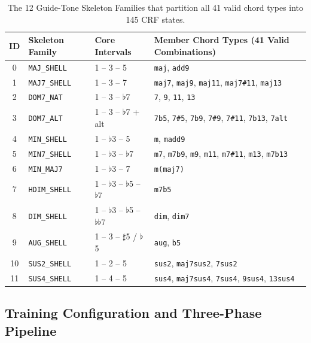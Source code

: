 \documentclass[a4paper]{article}
\begin{document}
\begin{table}[H]
    \centering
    \small
    \begin{tabular}{@{}clll@{}}
        \toprule
        \textbf{ID} & \textbf{Skeleton Family} & \textbf{Core Intervals} & \textbf{Member Chord Types (41 Valid Combinations)} \\
        \midrule
        0  & \texttt{MAJ\_SHELL}  & 1 -- 3 -- 5        & \texttt{maj}, \texttt{add9} \\
        1  & \texttt{MAJ7\_SHELL} & 1 -- 3 -- 7        & \texttt{maj7}, \texttt{maj9}, \texttt{maj11}, \texttt{maj7\#11}, \texttt{maj13} \\
        2  & \texttt{DOM7\_NAT}   & 1 -- 3 -- $\flat$7 & \texttt{7}, \texttt{9}, \texttt{11}, \texttt{13} \\
        3  & \texttt{DOM7\_ALT}   & 1 -- 3 -- $\flat$7 + alt & \texttt{7b5}, \texttt{7\#5}, \texttt{7b9}, \texttt{7\#9}, \texttt{7\#11}, \texttt{7b13}, \texttt{7alt} \\
        4  & \texttt{MIN\_SHELL}  & 1 -- $\flat$3 -- 5 & \texttt{m}, \texttt{madd9} \\
        5  & \texttt{MIN7\_SHELL} & 1 -- $\flat$3 -- $\flat$7 & \texttt{m7}, \texttt{m7b9}, \texttt{m9}, \texttt{m11}, \texttt{m7\#11}, \texttt{m13}, \texttt{m7b13} \\
        6  & \texttt{MIN\_MAJ7}   & 1 -- $\flat$3 -- 7 & \texttt{m(maj7)} \\
        7  & \texttt{HDIM\_SHELL} & 1 -- $\flat$3 -- $\flat$5 -- $\flat$7 & \texttt{m7b5} \\
        8  & \texttt{DIM\_SHELL}  & 1 -- $\flat$3 -- $\flat$5 -- $\flat\flat$7 & \texttt{dim}, \texttt{dim7} \\
        9  & \texttt{AUG\_SHELL}  & 1 -- 3 -- $\sharp$5 / $\flat$5 & \texttt{aug}, \texttt{b5} \\
        10 & \texttt{SUS2\_SHELL} & 1 -- 2 -- 5        & \texttt{sus2}, \texttt{maj7sus2}, \texttt{7sus2} \\
        11 & \texttt{SUS4\_SHELL} & 1 -- 4 -- 5        & \texttt{sus4}, \texttt{maj7sus4}, \texttt{7sus4}, \texttt{9sus4}, \texttt{13sus4} \\
        \bottomrule
    \end{tabular}
    \caption{The 12 Guide-Tone Skeleton Families that partition all 41 valid chord types into 145 CRF states.}
    \label{tab:skeleton_families}
\end{table}

\subsection{Training Configuration and Three-Phase Pipeline}
\end{document}
